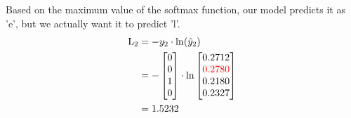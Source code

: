 \documentclass{article}
\begin{document}
Based on the maximum value of the softmax function, our model predicts it as 'e', but we actually want it to predict 'l'.
\begin{align*}
    \text{L}_{2} & = -y_2 \cdot \ln(\hat{y}_2) \\
    &=-\begin{bmatrix} 0 \\ 0 \\ 1 \\ 0 \end{bmatrix} \cdot \ln{\begin{bmatrix} 0.2712 \\ \textcolor{red}{0.2780} \\ 0.2180 \\ 0.2327 \end{bmatrix}}\\
    &=1.5232
\end{align*}
\end{document}
